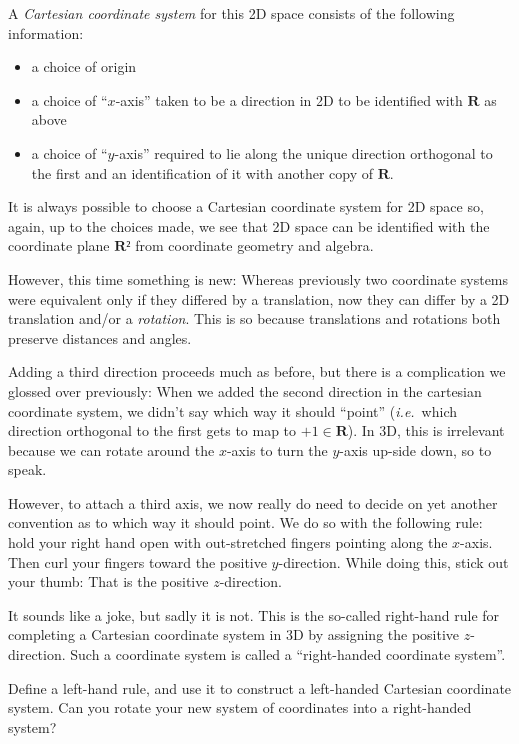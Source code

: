 A {\em Cartesian coordinate system} for this 2D space consists of the following information:
\begin{itemize}
\item a choice of origin
\item a choice of “$x$-axis” taken to be a direction in 2D to be identified with $𝐑$ as above
\item a choice of “$y$-axis” required to lie along the unique direction orthogonal to the first and an identification of it with another copy of $𝐑$.
\end{itemize}
It is always possible to choose a Cartesian coordinate system for 2D space so, again, up to the choices made, we see that 2D space can be identified with the coordinate plane $𝐑²$ from coordinate geometry and algebra. 

However, this time something is new: Whereas previously two coordinate systems were equivalent only if they differed by a translation, now they can differ by a 2D translation and/or a {\em rotation}. This is so because translations and rotations both preserve distances and angles. 

Adding a third direction proceeds much as before, but there is a complication we glossed over previously: When we added the second direction in the cartesian coordinate system, we didn't say which way it should “point” ({\it i.e.}\ which direction orthogonal to the first gets to map to $+1 ∈ 𝐑$). In 3D, this is irrelevant because we can rotate around the $x$-axis to turn the $y$-axis up-side down, so to speak. 

However, to attach a third axis, we now really do need to decide on yet another convention as to which way it should point. 
We do so with the following rule: hold your right hand open with out-stretched fingers pointing along the $x$-axis. Then curl your fingers toward the positive $y$-direction. While doing this, stick out your thumb: That is the positive $z$-direction. 

It sounds like a joke, but sadly it is not. This is the so-called right-hand rule for completing a Cartesian coordinate system in 3D by assigning the positive $z$-direction. Such a coordinate system is called a “right-handed coordinate system”. 

\begin{exercise}
Define a left-hand rule, and use it to construct a left-handed Cartesian coordinate system. 
Can you rotate your new system of coordinates into a right-handed system?
\end{exercise} 

